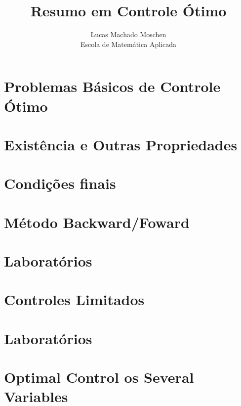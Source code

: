 \documentclass[12pt]{article}
\begin{document}
\newcommand{\e}{\epsilon}
\newcommand{\la}{\lambda}

\title{Resumo em Controle Ótimo}
\author{Lucas Machado Moschen\\ 
Escola de Matemática Aplicada}

\maketitle

\doublespacing
\section{Problemas Básicos de Controle Ótimo}


\section{Existência e Outras Propriedades}


\section{Condições finais}


\section{Método Backward/Foward}


\section{Laboratórios}


\section{Controles Limitados}


\section{Laboratórios}


\section{Optimal Control os Several Variables}

\end{document}
